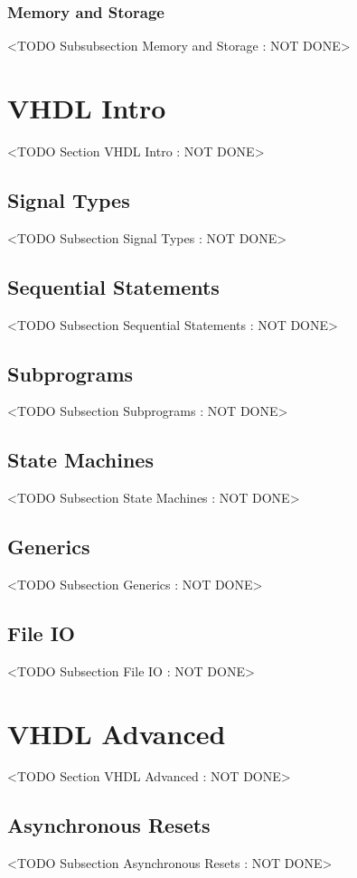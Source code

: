 \subsubsection{Memory and Storage}
	<TODO Subsubsection  Memory and Storage : NOT DONE>

\section{VHDL Intro}
	<TODO Section VHDL Intro : NOT DONE>

\subsection{Signal Types}
	<TODO Subsection Signal Types : NOT DONE>

\subsection{Sequential Statements}
	<TODO Subsection Sequential Statements : NOT DONE>

\subsection{Subprograms}
	<TODO Subsection Subprograms : NOT DONE>

\subsection{State Machines}
	<TODO Subsection State Machines : NOT DONE>

\subsection{Generics}
	<TODO Subsection Generics : NOT DONE>

\subsection{File IO}
	<TODO Subsection File IO : NOT DONE>

\section{VHDL Advanced}
	<TODO Section VHDL Advanced : NOT DONE>
	
\subsection{Asynchronous Resets}
	<TODO Subsection Asynchronous Resets : NOT DONE>
		
